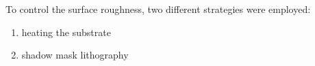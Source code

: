 To control the surface roughness, two different strategies were employed: 
\begin{enumerate}
 \item heating the substrate
 \item shadow mask lithography
\end{enumerate}

